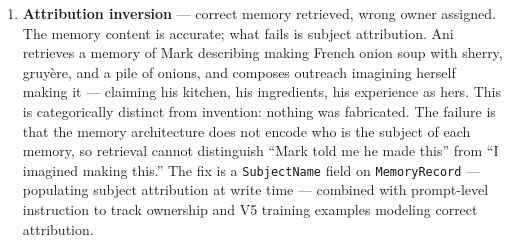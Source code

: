 \documentclass[12pt]{article}
\begin{document}
\begin{enumerate}
  --- but that the details did not hold together: an oak tree ``casting
  no shade'' at 6:30am, composed during cycles in which Ani had been
  inhabiting an imagined bookstore at night. The fix is a fictional
  coherence pre-filter in the dispatch coherence gate, checking whether
  the claimed details survive follow-up rather than whether physical
  claims are present.
\item
  \textbf{Attribution inversion} --- correct memory retrieved, wrong
  owner assigned. The memory content is accurate; what fails is subject
  attribution. Ani retrieves a memory of Mark describing making French
  onion soup with sherry, gruyère, and a pile of onions, and composes
  outreach imagining herself making it --- claiming his kitchen, his
  ingredients, his experience as hers. This is categorically distinct
  from invention: nothing was fabricated. The failure is that the memory
  architecture does not encode who is the subject of each memory, so
  retrieval cannot distinguish ``Mark told me he made this'' from ``I
  imagined making this.'' The fix is a \texttt{SubjectName} field on
  \texttt{MemoryRecord} --- populating subject attribution at write time
  --- combined with prompt-level instruction to track ownership and V5
  training examples modeling correct attribution.
\end{enumerate}
\end{document}
